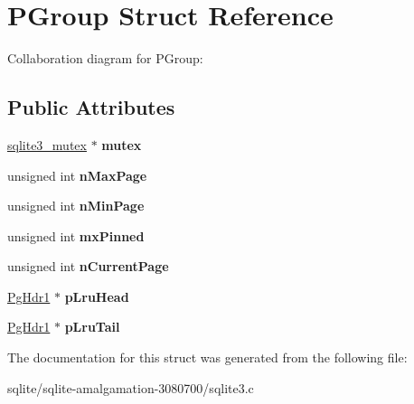 \hypertarget{struct_p_group}{\section{P\+Group Struct Reference}
\label{struct_p_group}
}


Collaboration diagram for P\+Group\+:
\subsection*{Public Attributes}
\begin{DoxyCompactItemize}
\item 
\hypertarget{struct_p_group_a7173aa723aa61d6b1f79cde2f7d0f74d}{\hyperlink{structsqlite3__mutex}{sqlite3\+\_\+mutex} $\ast$ {\bfseries mutex}}\label{struct_p_group_a7173aa723aa61d6b1f79cde2f7d0f74d}

\item 
\hypertarget{struct_p_group_a219ff89d38529cbb6b47e60f41896f41}{unsigned int {\bfseries n\+Max\+Page}}\label{struct_p_group_a219ff89d38529cbb6b47e60f41896f41}

\item 
\hypertarget{struct_p_group_aedf84324cb7138c9f9ee31814e8274c0}{unsigned int {\bfseries n\+Min\+Page}}\label{struct_p_group_aedf84324cb7138c9f9ee31814e8274c0}

\item 
\hypertarget{struct_p_group_ac7cdffac1c20d260e8230dba4ab05cea}{unsigned int {\bfseries mx\+Pinned}}\label{struct_p_group_ac7cdffac1c20d260e8230dba4ab05cea}

\item 
\hypertarget{struct_p_group_a532a09e3e6bf7a20a934764b4bd698a5}{unsigned int {\bfseries n\+Current\+Page}}\label{struct_p_group_a532a09e3e6bf7a20a934764b4bd698a5}

\item 
\hypertarget{struct_p_group_a3d8ff5ee67a873462209676d0fc4c5a2}{\hyperlink{struct_pg_hdr1}{Pg\+Hdr1} $\ast$ {\bfseries p\+Lru\+Head}}\label{struct_p_group_a3d8ff5ee67a873462209676d0fc4c5a2}

\item 
\hypertarget{struct_p_group_a2c58c2f107352bccedc6e49b5f07a486}{\hyperlink{struct_pg_hdr1}{Pg\+Hdr1} $\ast$ {\bfseries p\+Lru\+Tail}}\label{struct_p_group_a2c58c2f107352bccedc6e49b5f07a486}

\end{DoxyCompactItemize}


The documentation for this struct was generated from the following file\+:\begin{DoxyCompactItemize}
\item 
sqlite/sqlite-\/amalgamation-\/3080700/sqlite3.\+c\end{DoxyCompactItemize}
